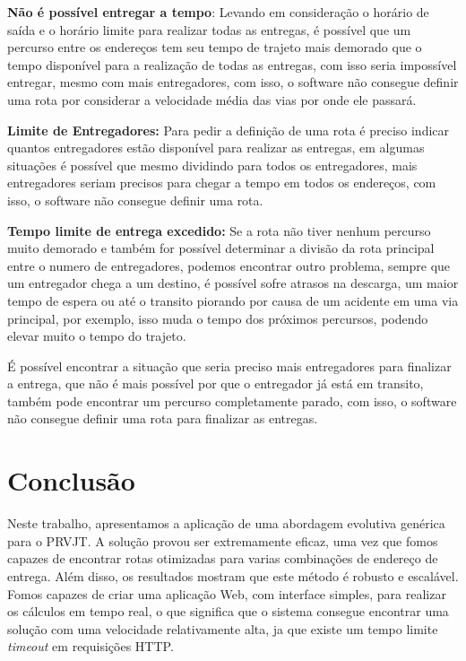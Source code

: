 \textbf{Não é possível entregar a tempo}: Levando em consideração o horário de saída e o horário limite para realizar todas as entregas, é possível que um percurso entre os endereços tem seu tempo de trajeto mais demorado que o tempo disponível para a realização de todas as entregas, com isso seria impossível entregar, mesmo com mais entregadores, com isso, o software não consegue definir uma rota por considerar a velocidade média das vias por onde ele passará.

\textbf{Limite de Entregadores:} Para pedir a definição de uma rota é preciso indicar quantos entregadores estão disponível para realizar as entregas, em algumas situações é possível que mesmo dividindo para todos os entregadores, mais entregadores seriam precisos para chegar a tempo em todos os endereços, com isso, o software não consegue definir uma rota.

\textbf{Tempo limite de entrega excedido:} Se a rota não tiver nenhum percurso muito demorado e também for possível determinar a divisão da rota principal entre o numero de entregadores, podemos encontrar outro problema, sempre que um entregador chega a um destino, é possível sofre atrasos na descarga, um maior tempo de espera ou até o transito piorando por causa de um acidente em uma via principal, por exemplo, isso muda o tempo dos próximos percursos, podendo elevar muito o tempo do trajeto.

É possível encontrar a situação que seria preciso mais entregadores para finalizar a entrega, que não é mais possível por que o entregador já está em transito, também pode encontrar um percurso completamente parado,  com isso, o software não consegue definir uma rota para finalizar as entregas.


\section{Conclusão}

Neste trabalho, apresentamos a aplicação de uma abordagem evolutiva genérica para o PRVJT. A solução provou ser extremamente eficaz, uma vez que fomos capazes de encontrar rotas otimizadas para varias combinações de endereço de entrega. Além disso, os resultados mostram que este método é robusto e escalável. 
Fomos capazes de criar uma aplicação Web, com interface simples, para realizar os cálculos em tempo real, o que significa que o sistema consegue encontrar uma solução com uma velocidade relativamente alta, ja que existe um tempo limite \textit{timeout} em requisições HTTP.

